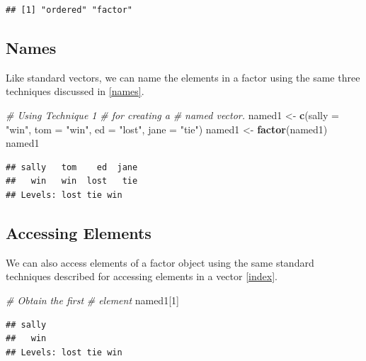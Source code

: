 \documentclass[
]{book}
\newenvironment{Shaded}{\begin{snugshade}}{\end{snugshade}}
\newcommand{\CommentTok}[1]{\textcolor[rgb]{0.56,0.35,0.01}{\textit{#1}}}
\newcommand{\DataTypeTok}[1]{\textcolor[rgb]{0.13,0.29,0.53}{#1}}
\newcommand{\DecValTok}[1]{\textcolor[rgb]{0.00,0.00,0.81}{#1}}
\newcommand{\KeywordTok}[1]{\textcolor[rgb]{0.13,0.29,0.53}{\textbf{#1}}}
\newcommand{\NormalTok}[1]{#1}
\newcommand{\StringTok}[1]{\textcolor[rgb]{0.31,0.60,0.02}{#1}}
\begin{document}
\begin{verbatim}
## [1] "ordered" "factor"
\end{verbatim}

\hypertarget{names-1}{%
\subsection{Names}\label{names-1}}

Like standard vectors, we can name the elements in a factor using the same three techniques discussed in \ref{names}.

\begin{Shaded}
\begin{Highlighting}[]
\CommentTok{# Using Technique 1}
\CommentTok{# for creating a}
\CommentTok{# named vector.}
\NormalTok{named1 <-}\StringTok{ }\KeywordTok{c}\NormalTok{(}\DataTypeTok{sally =} \StringTok{"win"}\NormalTok{,}
    \DataTypeTok{tom =} \StringTok{"win"}\NormalTok{, }\DataTypeTok{ed =} \StringTok{"lost"}\NormalTok{,}
    \DataTypeTok{jane =} \StringTok{"tie"}\NormalTok{)}
\NormalTok{named1 <-}\StringTok{ }\KeywordTok{factor}\NormalTok{(named1)}
\NormalTok{named1}
\end{Highlighting}
\end{Shaded}

\begin{verbatim}
## sally   tom    ed  jane 
##   win   win  lost   tie 
## Levels: lost tie win
\end{verbatim}

\hypertarget{accessing-elements}{%
\subsection{Accessing Elements}\label{accessing-elements}}

We can also access elements of a factor object using the same standard techniques described for accessing elements in a vector \ref{index}.

\begin{Shaded}
\begin{Highlighting}[]
\CommentTok{# Obtain the first}
\CommentTok{# element}
\NormalTok{named1[}\DecValTok{1}\NormalTok{]}
\end{Highlighting}
\end{Shaded}

\begin{verbatim}
## sally 
##   win 
## Levels: lost tie win
\end{verbatim}
\end{document}
